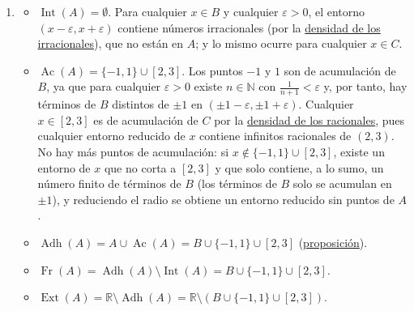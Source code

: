 \documentclass[
  spanish,
  a4paper,
]{scrreport}
\providecommand{\tightlist}{%
  \setlength{\itemsep}{0pt}\setlength{\parskip}{0pt}}
\theoremstyle{definition}
\theoremstyle{remark}
\begin{document}
\begin{tcolorbox}
\begin{enumerate}
  Para \(A\), como \(C\subseteq (2,3]\) y \(3\in\mathbb{Q}\), se tiene
  que \(3\in A\) y \(x\leq 3\) \(\forall x\in A\), por lo que
  \(\max(A) = \sup(A) = 3\). Por otro lado, como \(C\) está por encima
  de \(B\), \(\inf(A) = \inf(B) = -1\), y \(A\) no tiene mínimo ya que
  \(-1\not\in A\).
\item
  \begin{itemize}
  \tightlist
  \item
    \(\operatorname{Int}(A) = \emptyset\). Para cualquier \(x\in B\) y
    cualquier \(\varepsilon>0\), el entorno
    \((x-\varepsilon,x+\varepsilon)\) contiene números irracionales (por
    la
    \href{https://aprendeconalf.es/analisis-manual/02-numeros-reales.html\#thm-densidad-irracionales}{densidad
    de los irracionales}), que no están en \(A\); y lo mismo ocurre para
    cualquier \(x\in C\).
  \item
    \(\operatorname{Ac}(A) = \{-1, 1\}\cup [2,3]\). Los puntos \(-1\) y
    \(1\) son de acumulación de \(B\), ya que para cualquier
    \(\varepsilon>0\) existe \(n\in\mathbb{N}\) con
    \(\frac{1}{n+1}<\varepsilon\) y, por tanto, hay términos de \(B\)
    distintos de \(\pm 1\) en
    \((\pm 1-\varepsilon, \pm 1 + \varepsilon)\). Cualquier
    \(x\in [2,3]\) es de acumulación de \(C\) por la
    \href{https://aprendeconalf.es/analisis-manual/02-numeros-reales.html\#thm-densidad-racionales}{densidad
    de los racionales}, pues cualquier entorno reducido de \(x\)
    contiene infinitos racionales de \((2,3)\). No hay más puntos de
    acumulación: si \(x\not\in\{-1,1\}\cup[2,3]\), existe un entorno de
    \(x\) que no corta a \([2,3]\) y que solo contiene, a lo sumo, un
    número finito de términos de \(B\) (los términos de \(B\) solo se
    acumulan en \(\pm 1\)), y reduciendo el radio se obtiene un entorno
    reducido sin puntos de \(A\).
  \item
    \(\operatorname{Adh}(A) = A\cup \operatorname{Ac}(A) = B\cup\{-1,1\}\cup[2,3]\)
    (\href{https://aprendeconalf.es/analisis-manual/03-topologia-reales.html\#prp-adherencia-conjunto-mas-acumulacion}{proposición}).
  \item
    \(\operatorname{Fr}(A) = \operatorname{Adh}(A)\setminus \operatorname{Int}(A) = B\cup\{-1,1\}\cup[2,3]\).
  \item
    \(\operatorname{Ext}(A) = \mathbb{R}\setminus\operatorname{Adh}(A) = \mathbb{R}\setminus\left(B\cup\{-1,1\}\cup[2,3]\right)\).
  \end{itemize}


\end{enumerate}
\end{tcolorbox}
\end{document}
